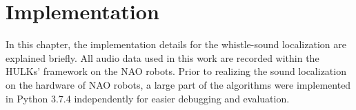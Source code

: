 \chapter{Implementation}
\label{chap:03_implementation}

In this chapter, the implementation details for the whistle-sound
localization are explained briefly.
All audio data used in this work are recorded within the HULKs' framework
on the NAO robots.
Prior to realizing the sound localization on the hardware of NAO robots,
a large part of the algorithms were implemented in Python 3.7.4 independently
for easier debugging and evaluation.







% 
